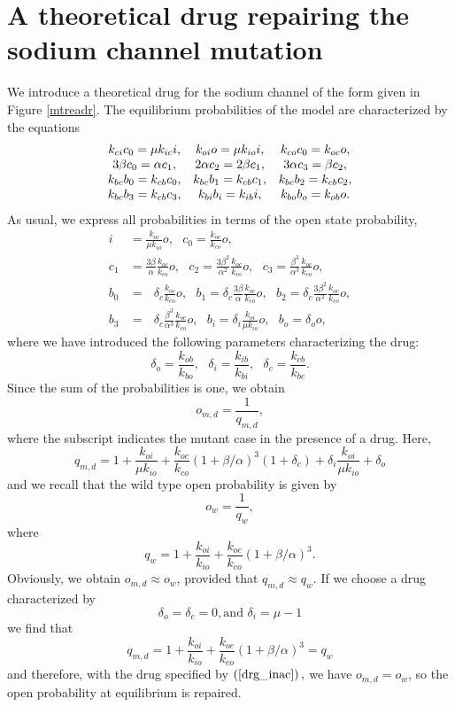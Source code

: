 \section[Theoretical drug for the Sodium channel]{A theoretical drug repairing the sodium channel mutation}

We introduce a theoretical drug for the sodium channel of the form given in
Figure \ref{mtreadr}. The equilibrium probabilities of the model are characterized by the equations
\[
\begin{array}
[c]{ccc}
k_{ci}c_{0}=\mu k_{ic}i, & k_{oi}o=\mu k_{io}i, & k_{co}c_{0}=k_{oc}o,\\
3\beta c_{0}=\alpha c_{1}, & 2\alpha c_{2}=2\beta c_{1}, & 3\alpha c_{3}=\beta
c_{2},\\
k_{bc}b_{0}=k_{cb}c_{0}, & k_{bc}b_{1}=k_{cb}c_{1}, & k_{bc}b_{2}=k_{cb}c_{2},\\
k_{bc}b_{3}=k_{cb}c_{3}, & k_{bi}b_{i}=k_{ib}i, & k_{bo}b_{o}=k_{ob}o.
\end{array}
\]
As usual, we express all probabilities in terms of the open state probability, \label{9001}
\begin{align*}
i &  =\frac{k_{oi}}{\mu k_{io}}o,\text{ }c_{0}=\frac{k_{oc}}{k_{co}}o,\text{
}\\
c_{1} &  =\frac{3\beta}{\alpha}\frac{k_{oc}}{k_{co}}o,\text{ }c_{2}
=\frac{3\beta^{2}}{\alpha^{2}}\frac{k_{oc}}{k_{co}}o,\text{ }c_{3}=\frac
{\beta^{3}}{\alpha^{3}}\frac{k_{oc}}{k_{co}}o,\\
b_{0} &  =\text{ }\delta_{c}\frac{k_{oc}}{k_{co}}o,\text{ }b_{1}=\text{
}\delta_{c}\frac{3\beta}{\alpha}\frac{k_{oc}}{k_{co}}o,\text{ }b_{2}=\text{
}\delta_{c}\frac{3\beta^{2}}{\alpha^{2}}\frac{k_{oc}}{k_{co}}o,\\
b_{3} &  =\text{ }\delta_{c}\frac{\beta^{3}}{\alpha^{3}}\frac{k_{oc}}{k_{co}
}o,\text{ }b_{i}=\delta_{i}\frac{k_{oi}}{\mu k_{io}}o,\text{ }b_{o}=\delta
_{o}o,
\end{align*}
where we have introduced the following parameters characterizing the drug:
\[
\delta_{o}=\frac{k_{ob}}{k_{bo}},\text{ }\delta_{i}=\frac{k_{ib}}{k_{bi}
},\text{ }\delta_{c}=\frac{k_{cb}}{k_{bc}}.
\]
Since the sum of the probabilities is one, we obtain
\[
o_{m,d}=\frac{1}{q_{m,d}},
\]
where the subscript indicates the mutant case in the presence of a drug. Here,
\[
q_{m,d}=1+\frac{k_{oi}}{\mu k_{io}}+\frac{k_{oc}}{k_{co}}\left(
1+\beta/\alpha\right)  ^{3}\left(  1+\delta_{c}\right)  +\delta_{i}
\frac{k_{oi}}{\mu k_{io}}+\delta_{o}
\]
and we recall that the wild type open probability is given by 
\[
o_{w}=\frac{1}{q_{w}},
\]
where
\[
q_{w}=1+\frac{k_{oi}}{k_{io}}+\frac{k_{oc}}{k_{co}}\left(  1+\beta
/\alpha\right)  ^{3}.
\]
Obviously, we obtain $o_{m,d}\approx o_{w}$, provided that $q_{m,d}\approx q_{w}$.
If we choose a drug characterized by
\begin{equation}
\delta_{o}=\delta_{c}=0,\text{and }\delta_{i}=\mu-1 \label{drg_inac}
\end{equation}
we find that
\[
q_{m,d}=1+\frac{k_{oi}}{k_{io}}+\frac{k_{oc}}{k_{co}}\left(  1+\beta
/\alpha\right)  ^{3}=q_{w}
\]
and therefore, with the drug specified by  $\left(  \ref{drg_inac}\right)
,$ we have $o_{m,d}=o_{w}$, so the open probability at equilibrium is repaired.



